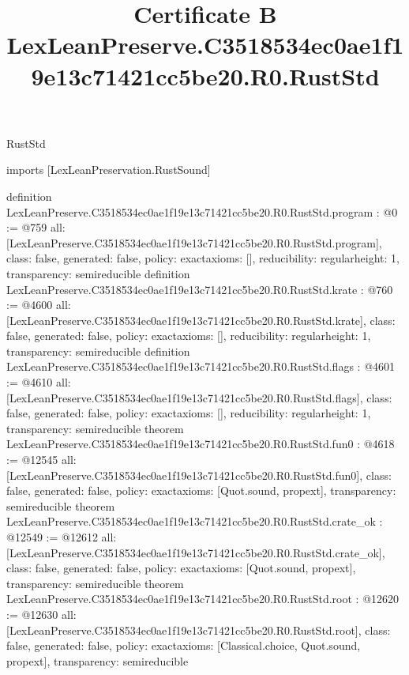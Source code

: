 \begin{lexlean}{RustStd}
\title{Certificate B LexLeanPreserve.C3518534ec0ae1f19e13c71421cc5be20.R0.RustStd}
\begin{coremodule}
imports [LexLeanPreservation.RustSound]

definition LexLeanPreserve.C3518534ec0ae1f19e13c71421cc5be20.R0.RustStd.program : @0 := @759 {
  all: [LexLeanPreserve.C3518534ec0ae1f19e13c71421cc5be20.R0.RustStd.program],
  class: false,
  generated: false,
  policy: exact{axioms: []},
  reducibility: regular{height: 1},
  transparency: semireducible
}
definition LexLeanPreserve.C3518534ec0ae1f19e13c71421cc5be20.R0.RustStd.krate : @760 := @4600 {
  all: [LexLeanPreserve.C3518534ec0ae1f19e13c71421cc5be20.R0.RustStd.krate],
  class: false,
  generated: false,
  policy: exact{axioms: []},
  reducibility: regular{height: 1},
  transparency: semireducible
}
definition LexLeanPreserve.C3518534ec0ae1f19e13c71421cc5be20.R0.RustStd.flags : @4601 := @4610 {
  all: [LexLeanPreserve.C3518534ec0ae1f19e13c71421cc5be20.R0.RustStd.flags],
  class: false,
  generated: false,
  policy: exact{axioms: []},
  reducibility: regular{height: 1},
  transparency: semireducible
}
theorem LexLeanPreserve.C3518534ec0ae1f19e13c71421cc5be20.R0.RustStd.fun0 : @4618 := @12545 {
  all: [LexLeanPreserve.C3518534ec0ae1f19e13c71421cc5be20.R0.RustStd.fun0],
  class: false,
  generated: false,
  policy: exact{axioms: [Quot.sound, propext]},
  transparency: semireducible
}
theorem LexLeanPreserve.C3518534ec0ae1f19e13c71421cc5be20.R0.RustStd.crate_ok : @12549 := @12612 {
  all: [LexLeanPreserve.C3518534ec0ae1f19e13c71421cc5be20.R0.RustStd.crate_ok],
  class: false,
  generated: false,
  policy: exact{axioms: [Quot.sound, propext]},
  transparency: semireducible
}
theorem LexLeanPreserve.C3518534ec0ae1f19e13c71421cc5be20.R0.RustStd.root : @12620 := @12630 {
  all: [LexLeanPreserve.C3518534ec0ae1f19e13c71421cc5be20.R0.RustStd.root],
  class: false,
  generated: false,
  policy: exact{axioms: [Classical.choice, Quot.sound, propext]},
  transparency: semireducible
}


\end{coremodule}
\end{lexlean}

